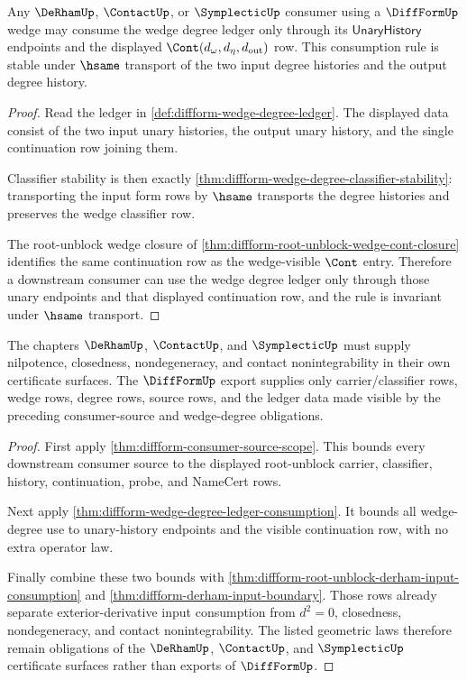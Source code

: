 \begin{theorem}
\label{thm:diffform-wedge-degree-ledger-consumption}
Any $\DeRhamUp$, $\ContactUp$, or $\SymplecticUp$ consumer using a
$\DiffFormUp$ wedge may consume the wedge degree ledger only through its
$\mathsf{UnaryHistory}$ endpoints and the displayed
$\Cont(d_{\omega},d_{\eta},d_{\mathrm{out}})$ row. This consumption rule is
stable under $\hsame$ transport of the two input degree histories and the
output degree history.
\end{theorem}
\begin{proof}
Read the ledger in \autoref{def:diffform-wedge-degree-ledger}. The displayed
data consist of the two input unary histories, the output unary history, and
the single continuation row joining them.

Classifier stability is then exactly
\autoref{thm:diffform-wedge-degree-classifier-stability}: transporting the
input form rows by $\hsame$ transports the degree histories and preserves the
wedge classifier row.

The root-unblock wedge closure of
\autoref{thm:diffform-root-unblock-wedge-cont-closure} identifies the same
continuation row as the wedge-visible $\Cont$ entry. Therefore a downstream
consumer can use the wedge degree ledger only through those unary endpoints
and that displayed continuation row, and the rule is invariant under
$\hsame$ transport.
\end{proof}

\begin{theorem}
\label{thm:diffform-exterior-consumer-boundary}
The chapters $\DeRhamUp$, $\ContactUp$, and $\SymplecticUp$ must supply
nilpotence, closedness, nondegeneracy, and contact nonintegrability in their
own certificate surfaces. The $\DiffFormUp$ export supplies only
carrier/classifier rows, wedge rows, degree rows, source rows, and the
ledger data made visible by the preceding consumer-source and wedge-degree
obligations.
\end{theorem}
\begin{proof}
First apply \autoref{thm:diffform-consumer-source-scope}. This bounds every
downstream consumer source to the displayed root-unblock carrier, classifier,
history, continuation, probe, and NameCert rows.

Next apply \autoref{thm:diffform-wedge-degree-ledger-consumption}. It bounds
all wedge-degree use to unary-history endpoints and the visible continuation
row, with no extra operator law.

Finally combine these two bounds with
\autoref{thm:diffform-root-unblock-derham-input-consumption} and
\autoref{thm:diffform-derham-input-boundary}. Those rows already separate
exterior-derivative input consumption from $d^2=0$, closedness,
nondegeneracy, and contact nonintegrability. The listed geometric laws
therefore remain obligations of the $\DeRhamUp$, $\ContactUp$, and
$\SymplecticUp$ certificate surfaces rather than exports of $\DiffFormUp$.
\end{proof}
